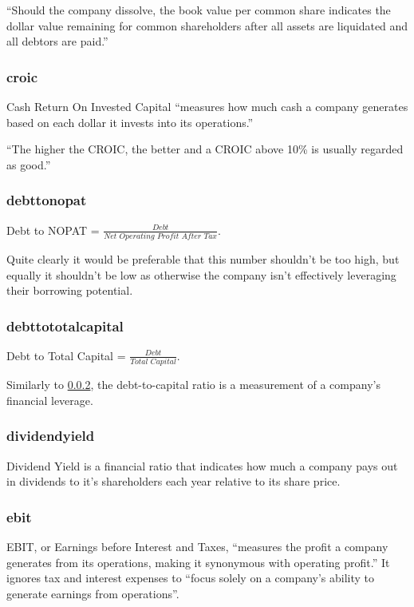 ``Should the company dissolve, the book value per common share indicates the dollar value remaining for common shareholders after all assets are liquidated and all debtors are paid.'' \cite{bookValuePerShare}

\subsubsection{croic}
Cash Return On Invested Capital ``measures how much cash a company generates based on each dollar it invests into its operations.'' \newline

``The higher the CROIC, the better and a CROIC above 10\% is usually regarded as good.''\cite{croic}

\subsubsection{debttonopat} \label{debttonopat}
Debt to NOPAT = $\frac{Debt}{Net \, \, Operating \, \, Profit \, \, After \, \, Tax}$. \newline

Quite clearly it would be preferable that this number shouldn't be too high, but equally it shouldn't be low as otherwise the company isn't effectively leveraging their borrowing potential.\cite{intrinioDataTags}

\subsubsection{debttototalcapital}
Debt to Total Capital = $\frac{Debt}{Total \, \, Capital}$. \newline

Similarly to \ref{debttonopat}, the debt-to-capital ratio is a measurement of a company's financial leverage.\cite{intrinioDataTags}

\subsubsection{dividendyield}
Dividend Yield is a financial ratio that indicates how much a company pays out in dividends to it's shareholders each year relative to its share price.\cite{intrinioDataTags}

\subsubsection{ebit}
EBIT, or Earnings before Interest and Taxes, ``measures the profit a company generates from its operations, making it synonymous with operating profit.'' It ignores tax and interest expenses to ``focus solely on a company's ability to generate earnings from operations''.\cite{intrinioDataTags}


